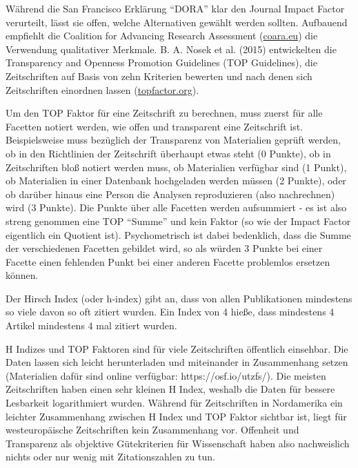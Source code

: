 \documentclass[
  letterpaper,
  DIV=11,
  numbers=noendperiod]{scrreprt}
\begin{document}
Während die San Francisco Erklärung ``DORA'' klar den Journal Impact
Factor verurteilt, lässt sie offen, welche Alternativen gewählt werden
sollten. Aufbauend empfiehlt die Coalition for Advancing Research
Assessment (\href{https://coara.eu/}{coara.eu}) die Verwendung
qualitativer Merkmale. B. A. Nosek et al. (2015) entwickelten die
Transparency and Openness Promotion Guidelines (TOP Guidelines), die
Zeitschriften auf Basis von zehn Kriterien bewerten und nach denen sich
Zeitschriften einordnen lassen (\url{topfactor.org}).

\begin{tcolorbox}[enhanced jigsaw, title=\textcolor{quarto-callout-note-color}{\faInfo}\hspace{0.5em}{TOP Faktor versus Hirsch Index}, colbacktitle=quarto-callout-note-color!10!white, rightrule=.15mm, titlerule=0mm, left=2mm, bottomrule=.15mm, arc=.35mm, leftrule=.75mm, toprule=.15mm, opacityback=0, breakable, bottomtitle=1mm, colframe=quarto-callout-note-color-frame, toptitle=1mm, opacitybacktitle=0.6, coltitle=black, colback=white]

Um den TOP Faktor für eine Zeitschrift zu berechnen, muss zuerst für
alle Facetten notiert werden, wie offen und transparent eine Zeitschrift
ist. Beispielsweise muss bezüglich der Transparenz von Materialien
geprüft werden, ob in den Richtlinien der Zeitschrift überhaupt etwas
steht (0 Punkte), ob in Zeitschriften bloß notiert werden muss, ob
Materialien verfügbar sind (1 Punkt), ob Materialien in einer Datenbank
hochgeladen werden müssen (2 Punkte), oder ob darüber hinaus eine Person
die Analysen reproduzieren (also nachrechnen) wird (3 Punkte). Die
Punkte über alle Facetten werden aufsummiert - es ist also streng
genommen eine TOP ``Summe'' und kein Faktor (so wie der Impact Factor
eigentlich ein Quotient ist). Psychometrisch ist dabei bedenklich, dass
die Summe der verschiedenen Facetten gebildet wird, so als würden 3
Punkte bei einer Facette einen fehlenden Punkt bei einer anderen Facette
problemlos ersetzen können.

Der Hirsch Index (oder h-index) gibt an, dass von allen Publikationen
mindestens so viele davon so oft zitiert wurden. Ein Index von 4 hieße,
dass mindestens 4 Artikel mindestens 4 mal zitiert wurden.

H Indizes und TOP Faktoren sind für viele Zeitschriften öffentlich
einsehbar. Die Daten lassen sich leicht herunterladen und miteinander in
Zusammenhang setzen (Materialien dafür sind online verfügbar:
https://osf.io/utzfs/). Die meisten Zeitschriften haben einen sehr
kleinen H Index, weshalb die Daten für bessere Lesbarkeit logarithmiert
wurden. Während für Zeitschriften in Nordamerika ein leichter
Zusammenhang zwischen H Index und TOP Faktor sichtbar ist, liegt für
westeuropäische Zeitschriften kein Zusammenhang vor. Offenheit und
Transparenz als objektive Gütekriterien für Wissenschaft haben also
nachweislich nichts oder nur wenig mit Zitationszahlen zu tun.


\end{tcolorbox}
\end{document}
